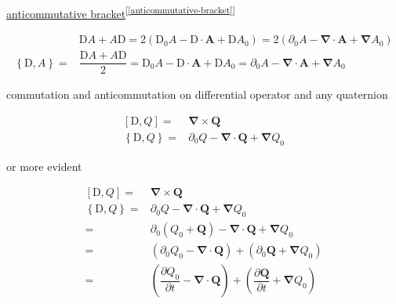 \documentclass[
]{book}
\theoremstyle{definition}
\theoremstyle{definition}
\theoremstyle{definition}
\theoremstyle{definition}
\theoremstyle{remark}
\begin{document}
\hyperref[anticommutative-bracket]{anticommutative bracket}\textsuperscript{{[}\ref{anticommutative-bracket}{]}}

\[
\begin{aligned}
 & \mathrm{D}A+A\mathrm{D}=2\left(\mathrm{D}_{{\scriptscriptstyle 0}}A-\boldsymbol{\mathrm{D}}\cdot\boldsymbol{A}+\boldsymbol{\mathrm{D}}A_{{\scriptscriptstyle 0}}\right)=2\left(\partial_{{\scriptscriptstyle 0}}A-\boldsymbol{\nabla}\cdot\boldsymbol{A}+\boldsymbol{\nabla}A_{{\scriptscriptstyle 0}}\right)\\
\left\{ \mathrm{D},A\right\} = & \dfrac{\mathrm{D}A+A\mathrm{D}}{2}=\mathrm{D}_{{\scriptscriptstyle 0}}A-\boldsymbol{\mathrm{D}}\cdot\boldsymbol{A}+\boldsymbol{\mathrm{D}}A_{{\scriptscriptstyle 0}}=\partial_{{\scriptscriptstyle 0}}A-\boldsymbol{\nabla}\cdot\boldsymbol{A}+\boldsymbol{\nabla}A_{{\scriptscriptstyle 0}}
\end{aligned}
\]

commutation and anticommutation on differential operator and any quaternion

\[
\begin{aligned}
\left[\mathrm{D},Q\right]= & \boldsymbol{\nabla}\times\boldsymbol{Q}\\
\left\{ \mathrm{D},Q\right\} = & \partial_{{\scriptscriptstyle 0}}Q-\boldsymbol{\nabla}\cdot\boldsymbol{Q}+\boldsymbol{\nabla}Q_{{\scriptscriptstyle 0}}
\end{aligned}
\]

or more evident

\[
\begin{aligned}
\left[\mathrm{D},Q\right]= & \boldsymbol{\nabla}\times\boldsymbol{Q}\\
\left\{ \mathrm{D},Q\right\} = & \partial_{{\scriptscriptstyle 0}}Q-\boldsymbol{\nabla}\cdot\boldsymbol{Q}+\boldsymbol{\nabla}Q_{{\scriptscriptstyle 0}}\\
= & \partial_{{\scriptscriptstyle 0}}\left(Q_{{\scriptscriptstyle 0}}+\boldsymbol{Q}\right)-\boldsymbol{\nabla}\cdot\boldsymbol{Q}+\boldsymbol{\nabla}Q_{{\scriptscriptstyle 0}}\\
= & \left(\partial_{{\scriptscriptstyle 0}}Q_{{\scriptscriptstyle 0}}-\boldsymbol{\nabla}\cdot\boldsymbol{Q}\right)+\left(\partial_{{\scriptscriptstyle 0}}\boldsymbol{Q}+\boldsymbol{\nabla}Q_{{\scriptscriptstyle 0}}\right)\\
= & \left(\dfrac{\partial Q_{{\scriptscriptstyle 0}}}{\partial t}-\boldsymbol{\nabla}\cdot\boldsymbol{Q}\right)+\left(\dfrac{\partial\boldsymbol{Q}}{\partial t}+\boldsymbol{\nabla}Q_{{\scriptscriptstyle 0}}\right)
\end{aligned}
\]
\end{document}
